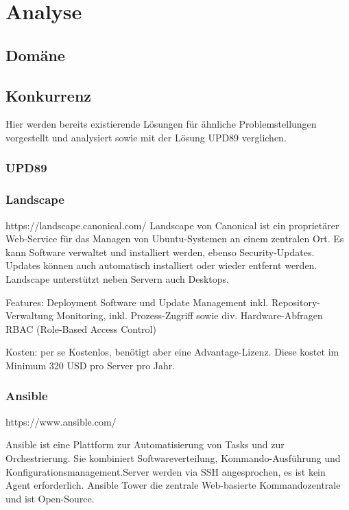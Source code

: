 \chapter{Analyse}

\section{Domäne}

\section{Konkurrenz} \label{sec:analysis:competition}

Hier werden bereits existierende Lösungen für ähnliche Problemstellungen vorgestellt und analysiert sowie mit der Lösung \gls{UPD89} verglichen.

\subsection{UPD89}


\subsection{Landscape}
https://landscape.canonical.com/
Landscape von Canonical ist ein proprietärer Web-Service für das Managen von Ubuntu-Systemen an einem zentralen Ort.
Es kann Software verwaltet und installiert werden, ebenso Security-Updates. Updates können auch automatisch installiert oder wieder entfernt werden.
Landscape unterstützt neben Servern auch Desktops.

Features:
Deployment
Software und Update Management inkl. Repository-Verwaltung
Monitoring, inkl. Prozess-Zugriff sowie div. Hardware-Abfragen
RBAC (Role-Based Access Control)

Kosten:
per se Kostenlos, benötigt aber eine Advantage-Lizenz. Diese kostet im Minimum 320 USD pro Server pro Jahr.

\subsection{Ansible}
https://www.ansible.com/

Ansible ist eine Plattform zur Automatisierung von Tasks und zur Orchestrierung. Sie kombiniert Softwareverteilung, Kommando-Ausführung und Konfigurationsmanagement.Server werden via SSH angesprochen, es ist kein Agent erforderlich.
Ansible Tower die zentrale Web-basierte Kommandozentrale und ist Open-Source.

